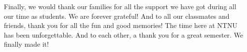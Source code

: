 \documentclass[b5paper,twoside,openright,11pt]{report}
\begin{document}
Finally, we would thank our families for all the support we have got during all our time as students. We are forever grateful! And to all our classmates and friends, thank you for all the fun and good memories! The time here at NTNU has been unforgettable. And to each other, a thank you for a great semester. We finally made it!   

\cleardoublepage
{}
\tableofcontents
\cleardoublepage

\cleardoublepage
\listoffigures
\cleardoublepage
\listoftables
\cleardoublepage
{}
\pagestyle{fancy}
\fancyhead[LE]{\thepage}
\fancyhead[RE]{\leftmark}
\fancyhead[RO]{\thepage}
\fancyhead[LO]{\rightmark}
\fancyfoot{}
\cleardoublepage

\cleardoublepage

\cleardoublepage

\cleardoublepage

\cleardoublepage

\cleardoublepage

\cleardoublepage

\cleardoublepage

\cleardoublepage

\cleardoublepage

\cleardoublepage

\cleardoublepage

\cleardoublepage

\cleardoublepage


\pagestyle{plain}
\cleardoublepage
\appendix 
  
\cleardoublepage
\end{document}
